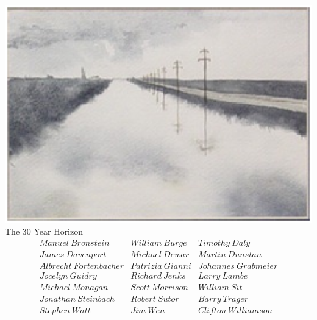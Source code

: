 \usepackage{hyperref}
\usepackage{axiom}
\usepackage{makeidx}
\setlength{\textwidth}{400pt}
\makeindex
\usepackage{graphicx}


\begin{titlepage}
\vskip 0.1in
\includegraphics{ps/bluebayou.ps}\\
\vskip 0.1in
{\Huge{The 30 Year Horizon}}
\vskip 0.1in
$$
\begin{array}{lll}
Manuel\ Bronstein      & William\ Burge   & Timothy\ Daly \\
James\ Davenport       & Michael\ Dewar   & Martin\ Dunstan \\
Albrecht\ Fortenbacher & Patrizia\ Gianni & Johannes\ Grabmeier \\
Jocelyn\ Guidry        & Richard\ Jenks   & Larry\ Lambe \\
Michael\ Monagan       & Scott\ Morrison  & William\ Sit \\
Jonathan\ Steinbach    & Robert\ Sutor    & Barry\ Trager \\
Stephen\ Watt          & Jim\ Wen         & Clifton\ Williamson
\end{array}
$$
\center{\large{\VolumeName}}
\end{titlepage}
